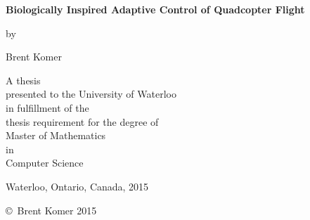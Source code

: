 \pagestyle{empty}

\begin{titlepage}
        \begin{center}
        \vspace*{1.0cm}

        \Huge
        {\bf Biologically Inspired Adaptive Control of Quadcopter Flight }

        \vspace*{1.0cm}

        \normalsize
        by \\

        \vspace*{1.0cm}

        \Large
        Brent Komer \\

        \vspace*{3.0cm}

        \normalsize
        A thesis \\
        presented to the University of Waterloo \\ 
        in fulfillment of the \\
        thesis requirement for the degree of \\
        Master of Mathematics \\
        in \\
        Computer Science \\

        \vspace*{2.0cm}

        Waterloo, Ontario, Canada, 2015 \\

        \vspace*{1.0cm}

        \copyright\ Brent Komer 2015 \\
        \end{center}
\end{titlepage}

\pagestyle{plain}
\setcounter{page}{2}

